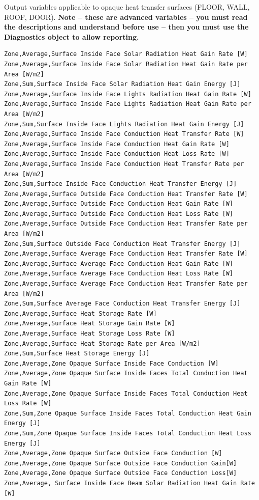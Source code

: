 Output variables applicable to opaque heat transfer surfaces (FLOOR, WALL, ROOF, DOOR). \textbf{Note -- these are advanced variables -- you must read the descriptions and understand before use -- then you must use the Diagnostics object to allow reporting.}

\begin{lstlisting}
Zone,Average,Surface Inside Face Solar Radiation Heat Gain Rate [W]
Zone,Average,Surface Inside Face Solar Radiation Heat Gain Rate per Area [W/m2]
Zone,Sum,Surface Inside Face Solar Radiation Heat Gain Energy [J]
Zone,Average,Surface Inside Face Lights Radiation Heat Gain Rate [W]
Zone,Average,Surface Inside Face Lights Radiation Heat Gain Rate per Area [W/m2]
Zone,Sum,Surface Inside Face Lights Radiation Heat Gain Energy [J]
Zone,Average,Surface Inside Face Conduction Heat Transfer Rate [W]
Zone,Average,Surface Inside Face Conduction Heat Gain Rate [W]
Zone,Average,Surface Inside Face Conduction Heat Loss Rate [W]
Zone,Average,Surface Inside Face Conduction Heat Transfer Rate per Area [W/m2]
Zone,Sum,Surface Inside Face Conduction Heat Transfer Energy [J]
Zone,Average,Surface Outside Face Conduction Heat Transfer Rate [W]
Zone,Average,Surface Outside Face Conduction Heat Gain Rate [W]
Zone,Average,Surface Outside Face Conduction Heat Loss Rate [W]
Zone,Average,Surface Outside Face Conduction Heat Transfer Rate per Area [W/m2]
Zone,Sum,Surface Outside Face Conduction Heat Transfer Energy [J]
Zone,Average,Surface Average Face Conduction Heat Transfer Rate [W]
Zone,Average,Surface Average Face Conduction Heat Gain Rate [W]
Zone,Average,Surface Average Face Conduction Heat Loss Rate [W]
Zone,Average,Surface Average Face Conduction Heat Transfer Rate per Area [W/m2]
Zone,Sum,Surface Average Face Conduction Heat Transfer Energy [J]
Zone,Average,Surface Heat Storage Rate [W]
Zone,Average,Surface Heat Storage Gain Rate [W]
Zone,Average,Surface Heat Storage Loss Rate [W]
Zone,Average,Surface Heat Storage Rate per Area [W/m2]
Zone,Sum,Surface Heat Storage Energy [J]
Zone,Average,Zone Opaque Surface Inside Face Conduction [W]
Zone,Average,Zone Opaque Surface Inside Faces Total Conduction Heat Gain Rate [W]
Zone,Average,Zone Opaque Surface Inside Faces Total Conduction Heat Loss Rate [W]
Zone,Sum,Zone Opaque Surface Inside Faces Total Conduction Heat Gain Energy [J]
Zone,Sum,Zone Opaque Surface Inside Faces Total Conduction Heat Loss Energy [J]
Zone,Average,Zone Opaque Surface Outside Face Conduction [W]
Zone,Average,Zone Opaque Surface Outside Face Conduction Gain[W]
Zone,Average,Zone Opaque Surface Outside Face Conduction Loss[W]
Zone,Average, Surface Inside Face Beam Solar Radiation Heat Gain Rate [W]
\end{lstlisting}

